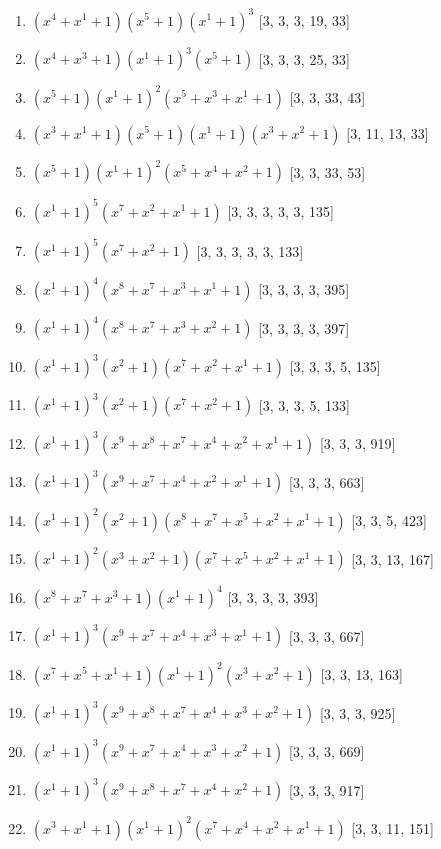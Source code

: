 \documentclass[10pt,twocolumn]{article}
\begin{document}
\begin{enumerate}
\item $(x^{4} + x^{1} + 1)(x^{5} + 1)(x^{1} + 1)^{3}$  [3, 3, 3, 19, 33]
\item $(x^{4} + x^{3} + 1)(x^{1} + 1)^{3}(x^{5} + 1)$  [3, 3, 3, 25, 33]
\item $(x^{5} + 1)(x^{1} + 1)^{2}(x^{5} + x^{3} + x^{1} + 1)$  [3, 3, 33, 43]
\item $(x^{3} + x^{1} + 1)(x^{5} + 1)(x^{1} + 1)(x^{3} + x^{2} + 1)$  [3, 11, 13, 33]
\item $(x^{5} + 1)(x^{1} + 1)^{2}(x^{5} + x^{4} + x^{2} + 1)$  [3, 3, 33, 53]
\item $(x^{1} + 1)^{5}(x^{7} + x^{2} + x^{1} + 1)$  [3, 3, 3, 3, 3, 135]
\item $(x^{1} + 1)^{5}(x^{7} + x^{2} + 1)$  [3, 3, 3, 3, 3, 133]
\item $(x^{1} + 1)^{4}(x^{8} + x^{7} + x^{3} + x^{1} + 1)$  [3, 3, 3, 3, 395]
\item $(x^{1} + 1)^{4}(x^{8} + x^{7} + x^{3} + x^{2} + 1)$  [3, 3, 3, 3, 397]
\item $(x^{1} + 1)^{3}(x^{2} + 1)(x^{7} + x^{2} + x^{1} + 1)$  [3, 3, 3, 5, 135]
\item $(x^{1} + 1)^{3}(x^{2} + 1)(x^{7} + x^{2} + 1)$  [3, 3, 3, 5, 133]
\item $(x^{1} + 1)^{3}(x^{9} + x^{8} + x^{7} + x^{4} + x^{2} + x^{1} + 1)$  [3, 3, 3, 919]
\item $(x^{1} + 1)^{3}(x^{9} + x^{7} + x^{4} + x^{2} + x^{1} + 1)$  [3, 3, 3, 663]
\item $(x^{1} + 1)^{2}(x^{2} + 1)(x^{8} + x^{7} + x^{5} + x^{2} + x^{1} + 1)$  [3, 3, 5, 423]
\item $(x^{1} + 1)^{2}(x^{3} + x^{2} + 1)(x^{7} + x^{5} + x^{2} + x^{1} + 1)$  [3, 3, 13, 167]
\item $(x^{8} + x^{7} + x^{3} + 1)(x^{1} + 1)^{4}$  [3, 3, 3, 3, 393]
\item $(x^{1} + 1)^{3}(x^{9} + x^{7} + x^{4} + x^{3} + x^{1} + 1)$  [3, 3, 3, 667]
\item $(x^{7} + x^{5} + x^{1} + 1)(x^{1} + 1)^{2}(x^{3} + x^{2} + 1)$  [3, 3, 13, 163]
\item $(x^{1} + 1)^{3}(x^{9} + x^{8} + x^{7} + x^{4} + x^{3} + x^{2} + 1)$  [3, 3, 3, 925]
\item $(x^{1} + 1)^{3}(x^{9} + x^{7} + x^{4} + x^{3} + x^{2} + 1)$  [3, 3, 3, 669]
\item $(x^{1} + 1)^{3}(x^{9} + x^{8} + x^{7} + x^{4} + x^{2} + 1)$  [3, 3, 3, 917]
\item $(x^{3} + x^{1} + 1)(x^{1} + 1)^{2}(x^{7} + x^{4} + x^{2} + x^{1} + 1)$  [3, 3, 11, 151]

\end{enumerate}
\end{document}
